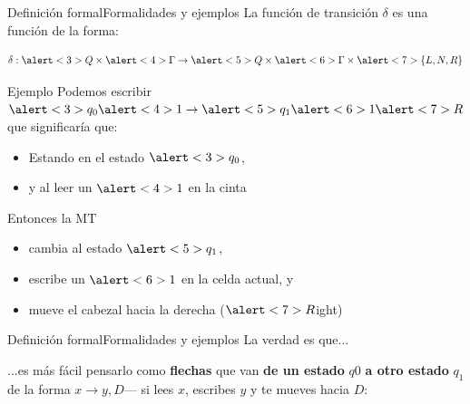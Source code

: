 \documentclass[spanish]{beamer}
\begin{document}
\begin{frame}{Definición formal}{Formalidades y ejemplos}
    La función de transición $\delta$ es una función de la forma:
    
    $$\delta : \alert<3>{Q} \times \alert<4>{\Gamma} \to \alert<5>{Q} \times \alert<6>{\Gamma} \times \alert<7>{\{L,N,R\}}$$ \pause

    \begin{exampleblock}{Ejemplo}
        Podemos escribir $\alert<3>{q_0} \alert<4>{1} \to \alert<5>{q_1} \alert<6>{1} \alert<7>{R}$ que significaría que: \pause

        \begin{itemize}
            \item Estando en el estado $\alert<3>{q_0}$, \pause
            \item y al leer un $\alert<4>{1}$ en la cinta \pause
        \end{itemize}
        Entonces la MT
        \begin{itemize}
            \item cambia al estado $\alert<5>{q_1}$, \pause
            \item escribe un $\alert<6>{1}$ en la celda actual, y \pause
            \item mueve el cabezal hacia la derecha ($\alert<7>{R}$ight)
        \end{itemize}
        
    \end{exampleblock}
    
\end{frame}

\begin{frame}{Definición formal}{Formalidades y ejemplos}
    La verdad es que... \pause

    \bigskip
    
    ...es más fácil pensarlo como \textbf{flechas} que van \textbf{de un estado} $q0$ \textbf{a otro estado} $q_1$ de la forma $x \to y, D$--- si \alert{lees $x$}, \alert{escribes $y$} y te \alert{mueves hacia $D$}: \pause

    \bigskip

    \begin{center}
    \end{center}
\end{frame}
\end{document}
